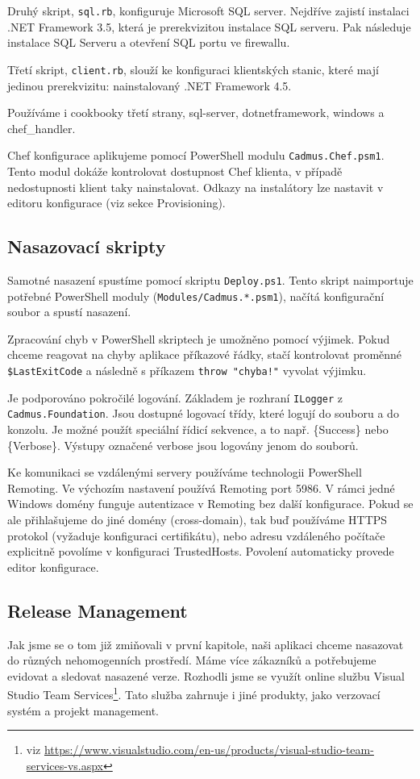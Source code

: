 Druhý skript, \texttt{sql.rb}, konfiguruje Microsoft SQL server. Nejdříve zajistí instalaci .NET Framework 3.5, která je prerekvizitou instalace SQL serveru. Pak následuje instalace SQL Serveru a otevření SQL portu ve firewallu.  

Třetí skript, \texttt{client.rb}, slouží ke konfiguraci klientských stanic, které mají jedinou prerekvizitu: nainstalovaný .NET Framework 4.5.

Používáme i cookbooky třetí strany, sql-server, dotnetframework, windows a chef\_handler.

Chef konfigurace aplikujeme pomocí PowerShell modulu \texttt{Cadmus.Chef.psm1}. Tento modul dokáže kontrolovat dostupnost Chef klienta, v případě nedostupnosti klient taky nainstalovat. Odkazy na instalátory lze nastavit v editoru konfigurace (viz sekce Provisioning).

\subsection{Nasazovací skripty}
Samotné nasazení spustíme pomocí skriptu \texttt{Deploy.ps1}. Tento skript naimportuje potřebné PowerShell moduly (\texttt{Modules/Cadmus.*.psm1}), načítá konfigurační soubor a spustí nasazení.

Zpracování chyb v PowerShell skriptech je umožněno pomocí výjimek. Pokud chceme reagovat na chyby aplikace příkazové řádky, stačí kontrolovat proměnné \texttt{\$LastExitCode} a následně s příkazem \texttt{throw "chyba!"} vyvolat výjimku.

Je podporováno pokročilé logování. Základem je rozhraní \texttt{ILogger} z \texttt{Cadmus.Foundation}. Jsou dostupné logovací třídy, které logují do souboru a do konzolu. Je možné použít speciální řídicí sekvence, a to např. \{Success\} nebo \{Verbose\}. Výstupy označené verbose jsou logovány jenom do souborů.

Ke komunikaci se vzdálenými servery používáme technologii PowerShell Remoting. Ve výchozím nastavení používá Remoting port 5986. V rámci jedné Windows domény funguje autentizace v Remoting bez další konfigurace. Pokud se ale přihlašujeme do jiné domény (cross-domain), tak buď používáme HTTPS protokol (vyžaduje konfiguraci certifikátu), nebo adresu vzdáleného počítače explicitně povolíme v konfiguraci TrustedHosts. Povolení  automaticky provede editor konfigurace.

\subsection{Release Management}
Jak jsme se o tom již zmiňovali v první kapitole, naši aplikaci chceme nasazovat do různých nehomogenních prostředí. Máme více zákazníků a potřebujeme evidovat a sledovat nasazené verze. Rozhodli jsme se využít online službu Visual Studio Team Services\footnote{viz \url{https://www.visualstudio.com/en-us/products/visual-studio-team-services-vs.aspx}}. Tato služba zahrnuje i jiné produkty, jako verzovací systém a projekt management.

